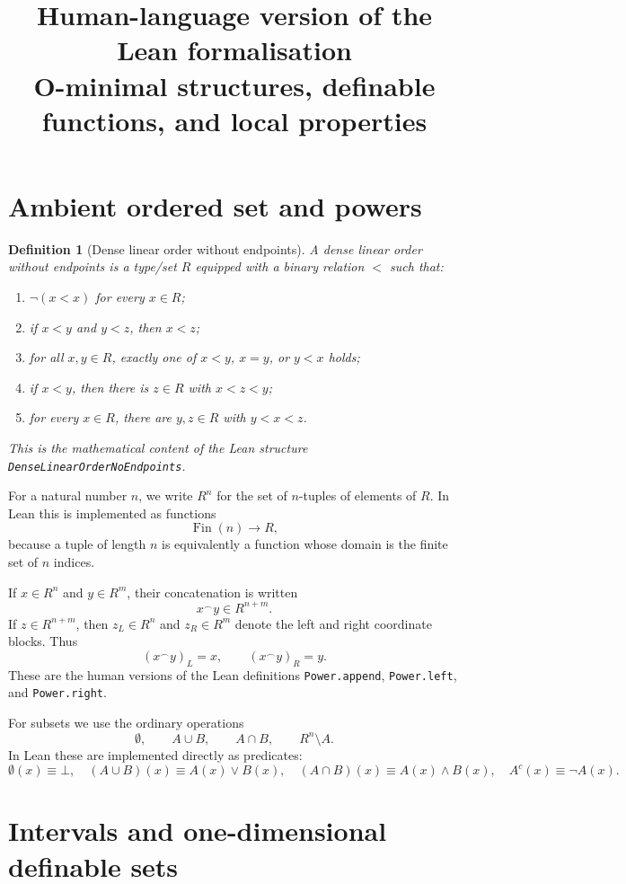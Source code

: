 \documentclass[11pt]{article}
\title{Human-language version of the Lean formalisation\\
O-minimal structures, definable functions, and local properties}
\author{}
\date{}
\newtheorem{definition}{Definition}[section]
\begin{document}
\maketitle

\section{Ambient ordered set and powers}

\begin{definition}[Dense linear order without endpoints]
A \emph{dense linear order without endpoints} is a type/set $R$ equipped with a binary relation $<$ such that:
\begin{enumerate}[label=(\roman*)]
  \item $\neg(x<x)$ for every $x\in R$;
  \item if $x<y$ and $y<z$, then $x<z$;
  \item for all $x,y\in R$, exactly one of $x<y$, $x=y$, or $y<x$ holds;
  \item if $x<y$, then there is $z\in R$ with $x<z<y$;
  \item for every $x\in R$, there are $y,z\in R$ with $y<x<z$.
\end{enumerate}
This is the mathematical content of the Lean structure
\texttt{DenseLinearOrderNoEndpoints}.
\end{definition}

For a natural number $n$, we write $R^n$ for the set of $n$-tuples of elements of $R$.
In Lean this is implemented as functions
\[
  \operatorname{Fin}(n)\to R,
\]
because a tuple of length $n$ is equivalently a function whose domain is the finite set of $n$ indices.

If $x\in R^n$ and $y\in R^m$, their concatenation is written
\[
  x\mathbin{{}^\frown}y\in R^{n+m}.
\]
If $z\in R^{n+m}$, then $z_L\in R^n$ and $z_R\in R^m$ denote the left and right coordinate blocks. Thus
\[
  (x\mathbin{{}^\frown}y)_L=x,
  \qquad
  (x\mathbin{{}^\frown}y)_R=y.
\]
These are the human versions of the Lean definitions
\texttt{Power.append}, \texttt{Power.left}, and \texttt{Power.right}.

For subsets we use the ordinary operations
\[
  \emptyset,\qquad A\cup B,\qquad A\cap B,
  \qquad R^n\setminus A.
\]
In Lean these are implemented directly as predicates:
\[
  \emptyset(x)\equiv \bot,
  \quad
  (A\cup B)(x)\equiv A(x)\lor B(x),
  \quad
  (A\cap B)(x)\equiv A(x)\land B(x),
  \quad
  A^c(x)\equiv \neg A(x).
\]

\section{Intervals and one-dimensional definable sets}
\end{document}
